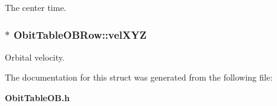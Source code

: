 The center time. 

\subsubsection{$\ast$ {\bf Obit\-Table\-OBRow::vel\-XYZ}}\label{structObitTableOBRow_o11}


Orbital velocity. 



The documentation for this struct was generated from the following file:\begin{CompactItemize}
\item 
{\bf Obit\-Table\-OB.h}\end{CompactItemize}
